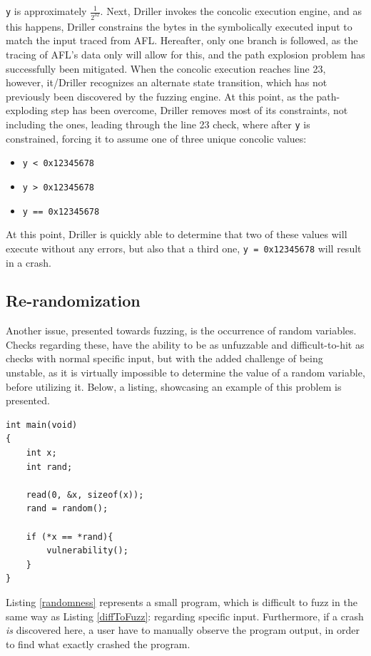 \documentclass[a4paper]{article}
\newcommand{\tit}[1]{\textit{#1}}
\newcommand{\ttt}[1]{\texttt{#1}}
\begin{document}
\ttt{y} is approximately $\frac{1}{2^{32}}$. Next, Driller invokes the concolic execution engine, and as this happens, Driller constrains the bytes in the symbolically executed input to match the input traced from AFL. Hereafter, only one branch is followed, as the tracing of AFL's data only will allow for this, and the path explosion problem has successfully been mitigated. When the concolic execution reaches line 23, however, it/Driller recognizes an alternate state transition, which has not previously been discovered by the fuzzing engine. At this point, as the path-exploding step has been overcome, Driller removes most of its constraints, not including the ones, leading through the line 23 check, where after \ttt{y} is constrained, forcing it to assume one of three unique concolic values:
\begin{itemize}[noitemsep]
	\item \ttt{y < 0x12345678}
	\item \ttt{y > 0x12345678}
	\item \ttt{y == 0x12345678}
\end{itemize}
At this point, Driller is quickly able to determine that two of these values will execute without any errors, but also that a third one, \ttt{y = 0x12345678} will result in a crash. 
\subsection{Re-randomization}
\label{sec:randomization}
Another issue, presented towards fuzzing, is the occurrence of random variables. Checks regarding these, have the ability to be as unfuzzable and difficult-to-hit as checks with normal specific input, but with the added challenge of being unstable, as it is virtually impossible to determine the value of a random variable, before utilizing it. Below, a listing, showcasing an example of this problem is presented.
\begin{lstlisting}[caption=A program featuring randomness,
label=randomness, captionpos=b]
int main(void)
{
    int x;
    int rand;
    
    read(0, &x, sizeof(x));
    rand = random();
    
    if (*x == *rand){
        vulnerability();
    }
}
\end{lstlisting}
Listing \ref{randomness} represents a small program, which is difficult to fuzz in the same way as Listing \ref{diffToFuzz}: regarding specific input. Furthermore, if a crash \tit{is} discovered here, a user have to manually observe the program output, in order to find what exactly crashed the program.
\end{document}
